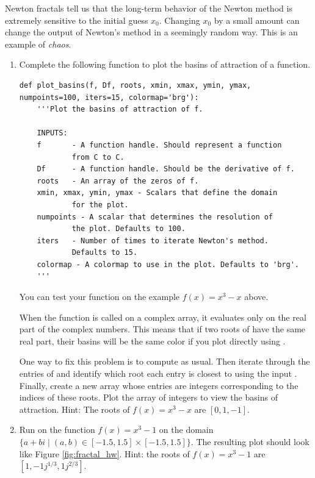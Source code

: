 Newton fractals tell us that the long-term behavior of the Newton method is extremely sensitive to the initial guess $x_0$.
Changing $x_0$ by a small amount can change the output of Newton's method in a seemingly random way.
This is an example of \emph{chaos}.





\begin{problem}
\leavevmode
\begin{enumerate}
\item Complete the following function to plot the basins of attraction of a function.
\begin{lstlisting}
def plot_basins(f, Df, roots, xmin, xmax, ymin, ymax, numpoints=100, iters=15, colormap='brg'):
    '''Plot the basins of attraction of f.
    
    INPUTS:
    f       - A function handle. Should represent a function 
            from C to C.
    Df      - A function handle. Should be the derivative of f.
    roots   - An array of the zeros of f.
    xmin, xmax, ymin, ymax - Scalars that define the domain 
            for the plot.
    numpoints - A scalar that determines the resolution of 
            the plot. Defaults to 100.
    iters   - Number of times to iterate Newton's method. 
            Defaults to 15.
    colormap - A colormap to use in the plot. Defaults to 'brg'.    
    '''
\end{lstlisting}
You can test your function on the example $f(x) = x^3-x$ above. 

When the function  is called on a complex array, it evaluates only on the real part of the complex numbers.
This means that if two roots of  have the same real part, their basins will be the same color if you plot directly using .

One way to fix this problem is to compute  as usual.
Then iterate through the entries of  and identify which root each entry is closest to using the input .
Finally, create a new array whose entries are integers corresponding to the indices of these roots.
Plot the array of integers to view the basins of attraction.  Hint: The roots of $f(x) = x^3-x$ are $[0,1,-1]$.


\item Run  on the function $f(x) = x^3-1$ on the domain $\{a+bi \mid (a, b) \in [-1.5, 1.5] \times [-1.5, 1.5] \}$. 
The resulting plot should look like Figure \ref{fig:fractal_hw}.  Hint: the roots of $f(x) = x^3-1$ are $[1,-1j^{1/3},1j^{2/3}]$.



\end{enumerate}
\end{problem}
